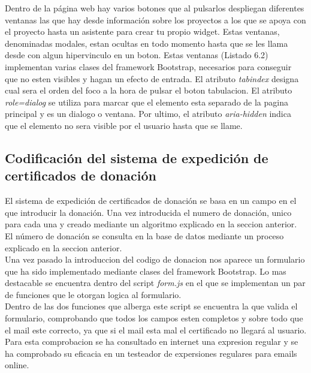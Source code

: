 
Dentro de la página web hay varios botones que al pulsarlos despliegan diferentes ventanas las que hay desde información sobre los proyectos a los que se apoya con el proyecto hasta un asistente para crear tu propio widget. Estas ventanas, denominadas modales, estan ocultas en todo momento hasta que se les llama desde con algun hipervinculo en un boton. Estas ventanas (Listado 6.2) implementan varias clases del framework Bootstrap, necesarios para conseguir que no esten visibles y hagan un efecto de entrada. El atributo \textit{tabindex} designa cual sera el orden del foco a la hora de pulsar el boton tabulacion. El atributo \textit{role=dialog} se utiliza para marcar que el elemento esta separado de la pagina principal y es un dialogo o ventana. Por ultimo, el atributo \textit{aria-hidden} indica que el elemento no sera visible por el usuario hasta que se llame.\\


\subsection{Codificación del sistema de expedición de certificados de donación}
El sistema de expedición de certificados de donación se basa en un campo en el que introducir la donación. Una vez introducida el numero de donación, unico para cada una y creado mediante un algoritmo explicado en la seccion anterior. El número de donación se consulta en la base de datos mediante un proceso explicado en la seccion anterior.\\

Una vez pasado la introduccion del codigo de donacion nos aparece un formulario que ha sido implementado mediante clases del framework Bootstrap. Lo mas destacable se encuentra dentro del script \textit{form.js} en el que se implementan un par de funciones que le otorgan logica al formulario.\\

Dentro de las dos funciones que alberga este script se encuentra la que valida el formulario, comprobando que todos los campos esten completos y sobre todo que el mail este correcto, ya que si el mail esta mal el certificado no llegará al usuario. Para esta comprobacion se ha consultado en internet una expresion regular y se ha comprobado su eficacia en un testeador de expersiones regulares para emails online. \\


